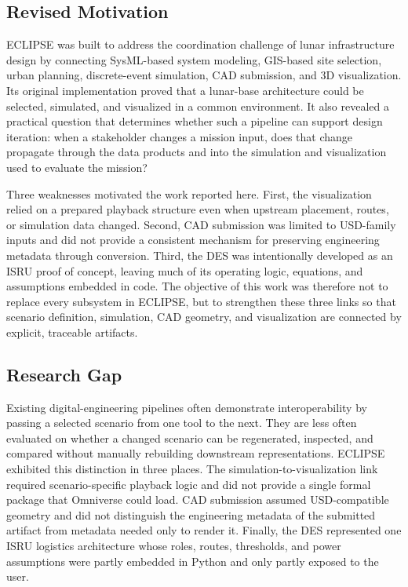 
\subsection{Revised Motivation}

ECLIPSE was built to address the coordination challenge of lunar infrastructure design by connecting SysML-based system modeling, GIS-based site selection, urban planning, discrete-event simulation, CAD submission, and 3D visualization. Its original implementation proved that a lunar-base architecture could be selected, simulated, and visualized in a common environment. It also revealed a practical question that determines whether such a pipeline can support design iteration: when a stakeholder changes a mission input, does that change propagate through the data products and into the simulation and visualization used to evaluate the mission?

Three weaknesses motivated the work reported here. First, the visualization relied on a prepared playback structure even when upstream placement, routes, or simulation data changed. Second, CAD submission was limited to USD-family inputs and did not provide a consistent mechanism for preserving engineering metadata through conversion. Third, the DES was intentionally developed as an ISRU proof of concept, leaving much of its operating logic, equations, and assumptions embedded in code. The objective of this work was therefore not to replace every subsystem in ECLIPSE, but to strengthen these three links so that scenario definition, simulation, CAD geometry, and visualization are connected by explicit, traceable artifacts.

\subsection{Research Gap}

Existing digital-engineering pipelines often demonstrate interoperability by passing a selected scenario from one tool to the next. They are less often evaluated on whether a changed scenario can be regenerated, inspected, and compared without manually rebuilding downstream representations. ECLIPSE exhibited this distinction in three places. The simulation-to-visualization link required scenario-specific playback logic and did not provide a single formal package that Omniverse could load. CAD submission assumed USD-compatible geometry and did not distinguish the engineering metadata of the submitted artifact from metadata needed only to render it. Finally, the DES represented one ISRU logistics architecture whose roles, routes, thresholds, and power assumptions were partly embedded in Python and only partly exposed to the user.

